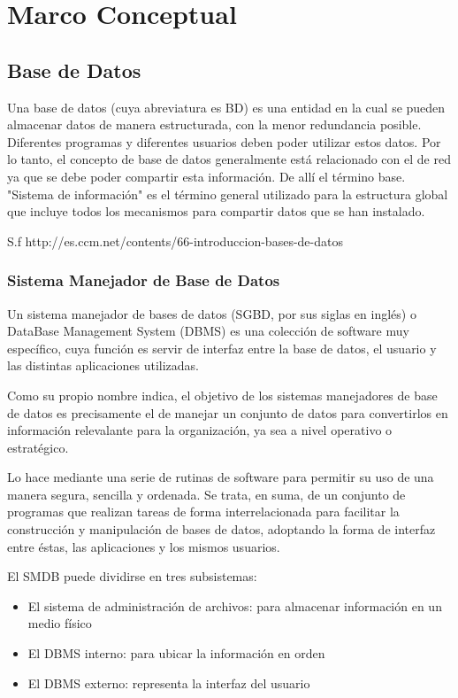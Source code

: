 \chapter{Marco Conceptual}


\section{Base de Datos} 	

Una base de datos (cuya abreviatura es BD) es una entidad en la cual se pueden almacenar datos de manera estructurada, con la menor redundancia posible. Diferentes programas y diferentes usuarios deben poder utilizar estos datos. Por lo tanto, el concepto de base de datos generalmente está relacionado con el de red ya que se debe poder compartir esta información. De allí el término base. "Sistema de información" es el término general utilizado para la estructura global que incluye todos los mecanismos para compartir datos que se han instalado.

S.f
http://es.ccm.net/contents/66-introduccion-bases-de-datos

\subsection{Sistema Manejador de Base de Datos}

Un sistema manejador de bases de datos (SGBD, por sus siglas en inglés) o DataBase Management System (DBMS) es una colección de software muy específico, cuya función es servir de interfaz entre la base de datos, el usuario y las distintas aplicaciones utilizadas.

Como su propio nombre indica, el objetivo de los sistemas manejadores de base de datos es precisamente el de manejar un conjunto de datos para convertirlos en información relevalante para la organización, ya sea a nivel operativo o estratégico.
 
Lo hace mediante una serie de rutinas de software para permitir su uso de una manera segura, sencilla y ordenada. Se trata, en suma, de un conjunto de programas que realizan tareas de forma interrelacionada para facilitar la construcción y manipulación de bases de datos, adoptando la forma de interfaz entre éstas, las aplicaciones y los mismos usuarios.

El SMDB puede dividirse en tres subsistemas:

\begin{itemize}

    \item El sistema de administración de archivos: para almacenar información en un medio físico
    
    \item El DBMS interno: para ubicar la información en orden
    
    \item El DBMS externo: representa la interfaz del usuario

\end{itemize}

